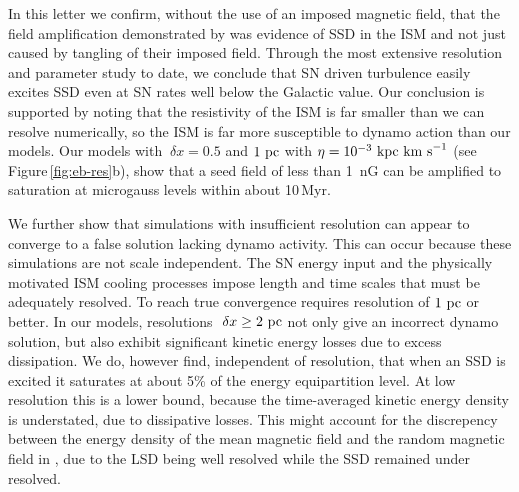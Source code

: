 \documentclass[preprint2]{aastex63}
\newcommand\kpc{~ {\rm kpc}}
\newcommand\pc{~ {\rm pc}}
\newcommand\dx{~ {\delta x}}
\newcommand\kms{~ {\rm km~ s}^{-1}}
\begin{document}
In this letter we confirm, without the use of an imposed magnetic field, that
the field amplification demonstrated by \citet{BKMM04} was evidence of 
SSD in the ISM and not just caused by
tangling of their imposed field.
Through the most extensive resolution and parameter study to date,
we conclude that SN driven turbulence easily excites SSD even at SN
rates well below the Galactic value.
     Our conclusion is supported by noting that the resistivity of the
     ISM is far smaller than we can resolve numerically, so the ISM is
     far more susceptible to dynamo action than our models.
Our models with $\dx=0.5$ and $1\pc$ with
$\eta=10^{-3}\kpc\kms$ (see
Figure\,\ref{fig:eb-res}b), 
show that a seed field of less than 1~nG can be amplified to saturation at
microgauss levels within about 10\,Myr.

We further show that simulations with insufficient resolution
     can
appear to converge to a false solution
     lacking dynamo activity.  This can occur because these     
simulations are not scale independent.
The SN energy input and the physically motivated ISM cooling processes impose
length and time scales that must be adequately resolved.
To
      reach true convergence requires resolution of $1\pc$ or better.
In our models, resolutions $\dx\geq2\pc$ not only give an incorrect dynamo
solution, but also exhibit significant kinetic energy losses due to excess
dissipation.
%
We do, however find, independent of resolution, that when an SSD is excited it
saturates at about 5\% of the energy equipartition level.
At low resolution this is a lower bound, because the time-averaged
kinetic energy density is understated, due to dissipative losses.
This might account for the discrepency between the energy density of the mean
magnetic field and the random magnetic field in \citet{Gent:2013b}, due to the
LSD being well resolved while the SSD remained under resolved.
\end{document}
